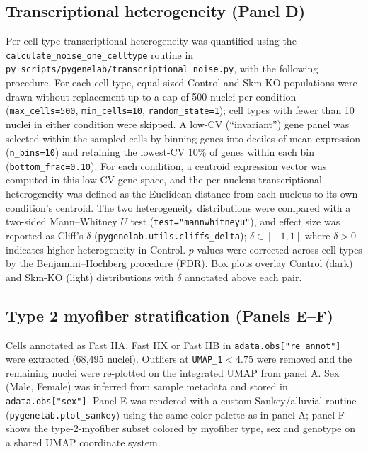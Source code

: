 \subsection*{Transcriptional heterogeneity (Panel D)}
Per-cell-type transcriptional heterogeneity was quantified using the \texttt{calculate\_noise\_one\_celltype} routine in \texttt{py\_scripts/pygenelab/transcriptional\_noise.py}, with the following procedure. For each cell type, equal-sized Control and Skm-KO populations were drawn without replacement up to a cap of 500 nuclei per condition (\texttt{max\_cells=500}, \texttt{min\_cells=10}, \texttt{random\_state=1}); cell types with fewer than 10 nuclei in either condition were skipped. A low-CV (``invariant'') gene panel was selected within the sampled cells by binning genes into deciles of mean expression (\texttt{n\_bins=10}) and retaining the lowest-CV 10\% of genes within each bin (\texttt{bottom\_frac=0.10}). For each condition, a centroid expression vector was computed in this low-CV gene space, and the per-nucleus transcriptional heterogeneity was defined as the Euclidean distance from each nucleus to its own condition's centroid. The two heterogeneity distributions were compared with a two-sided Mann--Whitney $U$ test (\texttt{test="mannwhitneyu"}), and effect size was reported as Cliff's $\delta$ (\texttt{pygenelab.utils.cliffs\_delta}); $\delta \in [-1,1]$ where $\delta>0$ indicates higher heterogeneity in Control. $p$-values were corrected across cell types by the Benjamini--Hochberg procedure (FDR). Box plots overlay Control (dark) and Skm-KO (light) distributions with $\delta$ annotated above each pair.

\subsection*{Type 2 myofiber stratification (Panels E--F)}
Cells annotated as Fast IIA, Fast IIX or Fast IIB in \texttt{adata.obs["re\_annot"]} were extracted (68{,}495 nuclei). Outliers at \texttt{UMAP\_1}$<4.75$ were removed and the remaining nuclei were re-plotted on the integrated UMAP from panel A. Sex (Male, Female) was inferred from sample metadata and stored in \texttt{adata.obs["sex"]}. Panel E was rendered with a custom Sankey/alluvial routine (\texttt{pygenelab.plot\_sankey}) using the same color palette as in panel A; panel F shows the type-2-myofiber subset colored by myofiber type, sex and genotype on a shared UMAP coordinate system.

